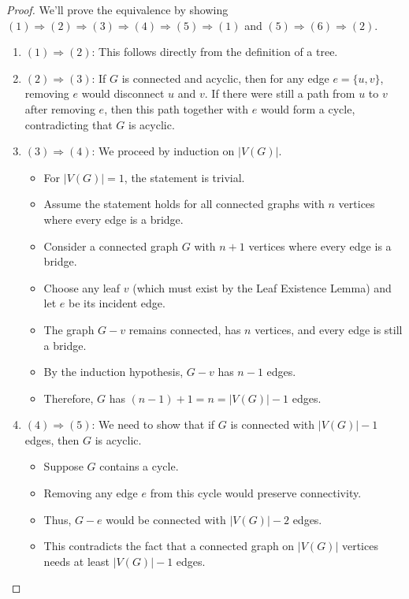 \documentclass{article}
\theoremstyle{definition}
\begin{document}
\begin{proof} 
We'll prove the equivalence by showing $(1) \Rightarrow (2) \Rightarrow (3) \Rightarrow (4) \Rightarrow (5) \Rightarrow (1)$ and $(5) \Rightarrow (6) \Rightarrow (2)$.

\begin{enumerate}
    \item $(1) \Rightarrow (2)$: This follows directly from the definition of a tree.
    
    \item $(2) \Rightarrow (3)$: If $G$ is connected and acyclic, then for any edge $e = \{u,v\}$, removing $e$ would disconnect $u$ and $v$. If there were still a path from $u$ to $v$ after removing $e$, then this path together with $e$ would form a cycle, contradicting that $G$ is acyclic.
    
    \item $(3) \Rightarrow (4)$: We proceed by induction on $|V(G)|$. 
    \begin{itemize}
        \item For $|V(G)| = 1$, the statement is trivial.
        \item Assume the statement holds for all connected graphs with $n$ vertices where every edge is a bridge.
        \item Consider a connected graph $G$ with $n+1$ vertices where every edge is a bridge.
        \item Choose any leaf $v$ (which must exist by the Leaf Existence Lemma) and let $e$ be its incident edge.
        \item The graph $G-v$ remains connected, has $n$ vertices, and every edge is still a bridge.
        \item By the induction hypothesis, $G-v$ has $n-1$ edges.
        \item Therefore, $G$ has $(n-1) + 1 = n = |V(G)| - 1$ edges.
    \end{itemize}
    
    \item $(4) \Rightarrow (5)$: We need to show that if $G$ is connected with $|V(G)| - 1$ edges, then $G$ is acyclic.
    \begin{itemize}
        \item Suppose $G$ contains a cycle.
        \item Removing any edge $e$ from this cycle would preserve connectivity.
        \item Thus, $G-e$ would be connected with $|V(G)| - 2$ edges.
        \item This contradicts the fact that a connected graph on $|V(G)|$ vertices needs at least $|V(G)| - 1$ edges.
    \end{itemize}
    

\end{enumerate}
\end{proof}
\end{document}
